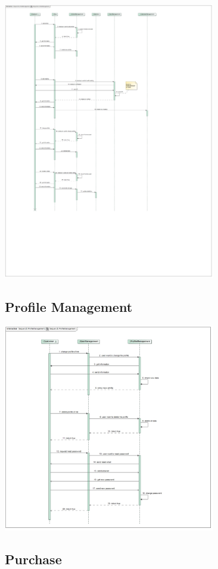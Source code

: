 \documentclass[a4paper]{article}
\begin{document}
\includegraphics[width=350px]{sd-articlemanagement.jpg}

\subsection{Profile Management}

\includegraphics[width=350px]{sd-profilemanagement.jpg}

\subsection{Purchase}
\end{document}
